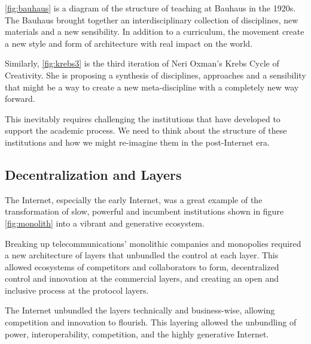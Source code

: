 \autoref{fig:bauhaus} is a diagram of the structure of teaching at Bauhaus in the 1920s. The Bauhaus brought together an interdisciplinary collection of disciplines, new materials and a new sensibility. In addition to a curriculum, the movement create a new style and form of architecture with real impact on the world.

Similarly, \autoref{fig:krebs3} is the third iteration of Neri Oxman's Krebs Cycle of Creativity. She is proposing a synthesis of disciplines, approaches and a sensibility that might be a way to create a new meta-discipline with a completely new way forward.

 This inevitably requires challenging the institutions that have developed to support the academic process. We need to think about the structure of these institutions and how we might re-imagine them in the post-Internet era.


\subsection{Decentralization and Layers}
\label{decentralization}

The Internet, especially the early Internet, was a great example of the transformation of slow, powerful and incumbent institutions shown in figure \autoref{fig:monolith} into a vibrant and generative ecosystem.

Breaking up telecommunications' monolithic companies and monopolies required a new architecture of layers that unbundled the control at each layer. This allowed ecosystems of competitors and collaborators to form, decentralized control and innovation at the commercial layers, and creating an open and inclusive process at the protocol layers.

The Internet unbundled the layers technically and business-wise, allowing competition and innovation to flourish. This layering allowed the unbundling of power, interoperability, competition, and the highly generative Internet.


